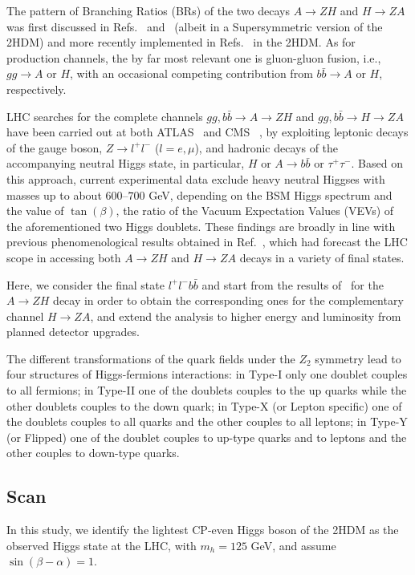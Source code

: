 The pattern of Branching Ratios (BRs) of the two decays \(A\to ZH\) and \(H\to ZA\) was first discussed in Refs.~\cite{Moretti1994belowThreshold} and~\cite{Djouadi1995twoAndthree}
(albeit in a Supersymmetric version of the 2HDM) and more recently implemented in Refs.~\cite{Djouadi1998HDECAY,Krause20202HDECAY} in the 2HDM.
As for production channels, the by far most relevant one  is gluon-gluon fusion, i.e., \(gg\to A\) or \(H\),
with an occasional competing contribution from \(b\bar b\to A\) or \(H\), respectively. 

LHC searches for the complete channels \(gg,b\bar b\to A\to ZH\) and \(gg, b\bar b\to H\to ZA\) have been carried out at both ATLAS~\cite{Aaboud2018AZHbbll} and CMS ~\cite{Khachatryan2016resonancesbbtautau,Sirunyan2020newneutral},
by exploiting leptonic decays of the gauge boson, \(Z\to l^+l^-\) (\(l=e,\mu\)),  and hadronic decays of
the accompanying neutral Higgs state, in particular, \(H\) or \(A\to b\bar b\) or \(\tau^+\tau^-\).
Based on this approach, 
current experimental data exclude heavy neutral Higgses with masses up to about \(600\)--\(700\) GeV,
depending on the BSM Higgs spectrum and the value of \(\tan(\beta)\), 
the ratio of the Vacuum Expectation Values (VEVs) of the aforementioned two Higgs doublets.
These findings are broadly in line with previous phenomenological results obtained in 
Ref.~\cite{Coleppa2014ExoticHZA}, which had forecast the LHC scope in accessing both \(A\to ZH\) and \(H\to ZA\) decays in a variety of final states. 

Here, we consider the final state \( l^+l^- b\bar b\) and start from the results of~\cite{Aaboud2018AZHbbll}
for the \(A\to ZH\) decay in order to obtain the corresponding ones for the complementary channel \(H\to ZA\),
and extend the analysis to higher energy and luminosity from planned detector upgrades.


The different transformations of the quark fields under the \(Z_2\) symmetry lead to four structures of Higgs-fermions interactions:
in Type-I only one doublet couples to all fermions;
in Type-II one of the doublets couples to the up quarks while the other doublets couples to the down quark;
in Type-X (or Lepton specific)  one of the doublets couples to all quarks and the other couples to all leptons;
in Type-Y (or Flipped) one of the doublet couples to up-type quarks and to leptons and the other couples to down-type quarks. 
\subsection{Scan}
In this study, we identify the lightest CP-even Higgs boson of the 2HDM as the observed Higgs state at the LHC, with $m_h=125$ GeV, 
and assume \(\sin (\beta-\alpha) = 1\).

